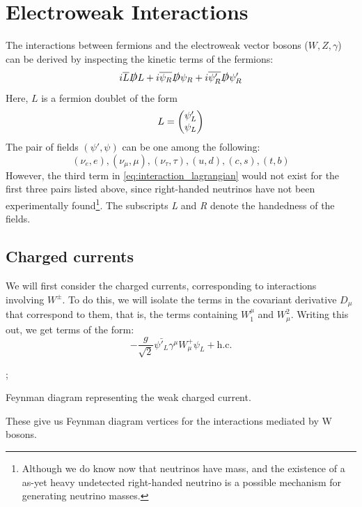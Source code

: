 \section{Electroweak Interactions}

The interactions between fermions and the electroweak vector bosons ($W,Z,\gamma$) can be derived by inspecting the kinetic terms of the fermions:
\begin{equation}
  i\bar{L}\slashed{D}L + i\bar{\psi_R}\slashed{D}\psi_R + i\bar{\psi'_R}\slashed{D}\psi'_R
\label{eq:interaction_lagrangian}
\end{equation}
Here, $L$ is a fermion doublet of the form
$$L = \begin{pmatrix} \psi'_L \\ \psi_L\end{pmatrix}$$
The pair of fields $(\psi', \psi)$ can be one among the following: 
$$(\nu_e,e), (\nu_\mu,\mu), (\nu_\tau, \tau), (u, d), (c, s), (t, b)$$
However, the third term in \autoref{eq:interaction_lagrangian} would not exist for the first three pairs listed above, since right-handed neutrinos have not been experimentally found\footnote{Although we do know now that neutrinos have mass, and the existence of a as-yet heavy undetected right-handed neutrino is a possible mechanism for generating neutrino masses.}. The subscripts \emph{L} and \emph{R} denote the handedness of the fields.
\subsection{Charged currents}
We will first consider the charged currents, corresponding to interactions involving $W^\pm$. To do this, we will isolate the terms in the covariant derivative $D_\mu$ that correspond to them, that is, the terms containing $W_1^\mu$ and $W_\mu^2$. Writing this out, we get terms of the form:
\begin{equation*}
  -\frac{g}{\sqrt{2}}\bar{\psi'_L}\gamma^\mu W_\mu^+\psi_L + \text{h.c}.
\end{equation*}
\begin{marginfigure}
;
\caption{Feynman diagram representing the weak charged current.}
\end{marginfigure}
These give us Feynman diagram vertices for the interactions mediated by W bosons.
